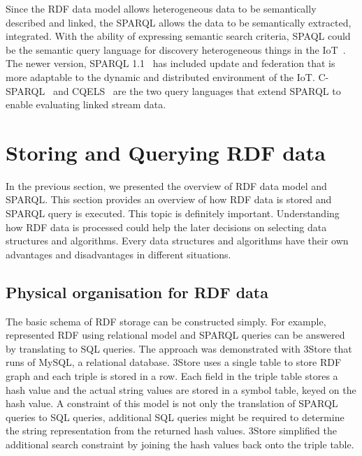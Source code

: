 {Since the RDF data model allows heterogeneous data to be semantically described and linked, the SPARQL allows the data to be semantically extracted, integrated.
With the ability of expressing semantic search criteria, SPAQL could be the semantic query language for discovery heterogeneous things in the IoT~\citep{Jsan:2013,Chun:2015}.
The newer version, SPARQL 1.1~\citep{Harris:2013} has included update and federation that is more adaptable to the dynamic and distributed environment of the IoT. 
C-SPARQL~\citep{Barbieri:2009} and CQELS~\citep{Le-Phuoc:2011} are the two query languages that extend SPARQL to enable evaluating linked stream data.


\section{Storing and Querying RDF data}
\label{s:sq}

In the previous section, we presented the overview of RDF data model and SPARQL.
This section provides an overview of how RDF data is stored and SPARQL query is executed. 
This topic is definitely important.
Understanding how RDF data is processed could help the later decisions on selecting data structures and algorithms.
Every data structures and algorithms have their own advantages and disadvantages in different situations.

\subsection{Physical organisation for RDF data}

The basic schema of RDF storage can be constructed simply.
For example, \cite{Harris:2005} represented RDF using relational model and SPARQL queries can be answered by translating to SQL queries.
The approach was demonstrated with 3Store that runs of MySQL, a relational database.
3Store uses a single table to store RDF graph and each triple is stored in a row. 
Each field in the triple table stores a hash value and the actual string values are stored in a symbol table, keyed on the hash value.
A constraint of this model is not only the translation of SPARQL queries to SQL queries, additional SQL queries might be required to determine the string representation from the returned hash values. 
3Store simplified the additional search constraint by joining the hash values back onto the triple table.

}
